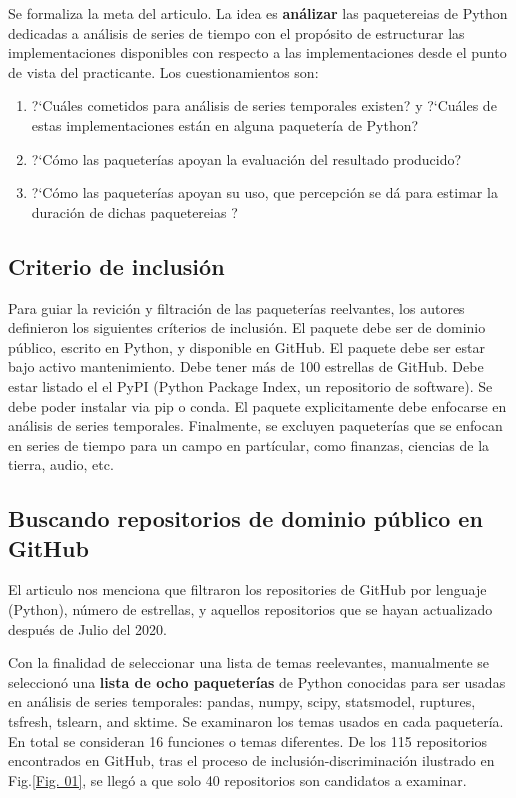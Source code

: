 \documentclass[a4paper, 11pt]{article}
\begin{document}
Se formaliza la meta del articulo.  La idea es \textbf{análizar} las paquetereias de Python dedicadas a análisis de series de tiempo con el propósito de estructurar las implementaciones disponibles con respecto a las implementaciones desde el punto de vista del practicante. Los cuestionamientos son:
\begin{enumerate}
    \item ?`Cuáles cometidos para análisis de series temporales existen? y ?`Cuáles de estas implementaciones están en alguna paquetería de Python?
    \item ?`Cómo las paqueterías apoyan la evaluación del resultado producido?
    \item ?`Cómo las paqueterías apoyan su uso, que percepción se dá para estimar la duración de dichas paquetereias ?
\end{enumerate}

\subsection{Criterio de inclusión}

Para guiar la revición y filtración de las paqueterías reelvantes, los autores definieron los siguientes críterios de  inclusión. El paquete debe ser de dominio público, escrito en Python, y disponible en GitHub. El paquete debe ser estar bajo activo mantenimiento. Debe tener más de 100 estrellas de GitHub. Debe estar listado el el PyPI (Python Package Index, un repositorio de software). Se debe poder instalar via pip o conda. El paquete explicitamente debe enfocarse en análisis de series temporales. Finalmente, se excluyen paqueterías que se enfocan en series de tiempo para un campo en partícular, como finanzas, ciencias de la tierra, audio, etc.

\subsection{Buscando repositorios de dominio público en GitHub}

El articulo nos menciona que filtraron los repositories de GitHub por lenguaje (Python), número de estrellas, y aquellos repositorios que se hayan actualizado después de Julio del 2020.

Con la finalidad de seleccionar una lista de temas reelevantes, manualmente se seleccionó una \textbf{lista de ocho paqueterías} de Python conocidas para ser usadas en análisis de series temporales: pandas, numpy, scipy, statsmodel, ruptures, tsfresh, tslearn, and sktime. Se examinaron los temas usados en cada paquetería. En total se consideran 16 funciones o temas diferentes. De los 115 repositorios encontrados en GitHub, tras el proceso de inclusión-discriminación ilustrado en Fig.\ref{Fig. 01}, se llegó a que solo 40 repositorios son candidatos a examinar.
\end{document}
